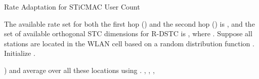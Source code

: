 \documentclass[peerreview,draftcls,onecolumn,12pt,a4paper]{IEEEtran}
\begin{document}
\begin{algorithm}
\begin{minipage}{1\linewidth}
\caption{Rate Adaptation for STiCMAC User Count}
 \label{usercountsearch}
\begin{algorithmic}[1]
\small \STATE The available rate set for both the
first hop () and the second hop () is , and the set of available orthogonal STC
dimensions for R-DSTC is , where . Suppose all stations are located in the
WLAN cell based on a random distribution function .
{Initialize }.

  ) and average over
all these locations using . \ENDFOR {} \STATE , , , \ \ENDIF \ENDFOR

 \end{algorithmic}
\end{minipage}
\end{algorithm}
\end{document}

